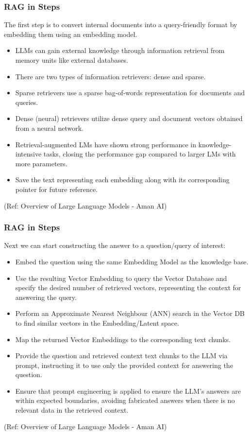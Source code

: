 \begin{frame}[fragile]\frametitle{RAG in Steps}

The first step is to convert internal documents into a query-friendly format by embedding them using an embedding model.

\begin{itemize}
\item LLMs can gain external knowledge through information retrieval from memory units like external databases.
\item There are two types of information retrievers: dense and sparse.
\item Sparse retrievers use a sparse bag-of-words representation for documents and queries.
\item Dense (neural) retrievers utilize dense query and document vectors obtained from a neural network.
\item Retrieval-augmented LMs have shown strong performance in knowledge-intensive tasks, closing the performance gap compared to larger LMs with more parameters.
\item Save the text representing each embedding along with its corresponding pointer for future reference.
\end{itemize}

{\tiny (Ref: Overview of Large Language Models - Aman AI)}

\end{frame}

\begin{frame}[fragile]\frametitle{RAG in Steps}

Next we can start constructing the answer to a question/query of interest:

\begin{itemize}
\item Embed the question using the same Embedding Model as the knowledge base.
\item Use the resulting Vector Embedding to query the Vector Database and specify the desired number of retrieved vectors, representing the context for answering the query.
\item Perform an Approximate Nearest Neighbour (ANN) search in the Vector DB to find similar vectors in the Embedding/Latent space.
\item Map the returned Vector Embeddings to the corresponding text chunks.
\item Provide the question and retrieved context text chunks to the LLM via prompt, instructing it to use only the provided context for answering the question.
\item Ensure that prompt engineering is applied to ensure the LLM's answers are within expected boundaries, avoiding fabricated answers when there is no relevant data in the retrieved context.
\end{itemize}

{\tiny (Ref: Overview of Large Language Models - Aman AI)}

\end{frame}

